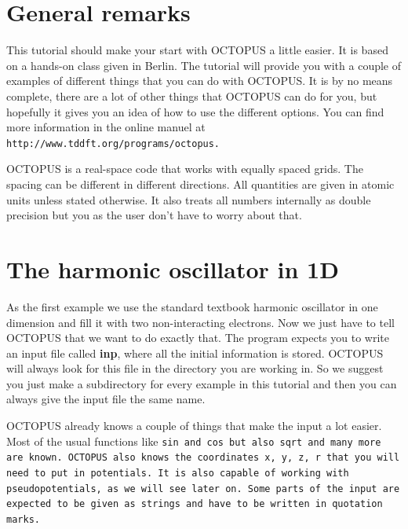\documentclass{article}
\begin{document}
\thispagestyle{empty}

\pagebreak

\tableofcontents

\pagebreak

\section{General remarks}

This tutorial should make your start with OCTOPUS a little easier. It is based
on a hands-on class given in Berlin. The tutorial will provide you with a
couple of examples of different things that you can do with OCTOPUS. It is by
no means complete, there are a lot of other things that OCTOPUS can do for you,
but hopefully it gives you an idea of how to use the different options. You can
find more information in the online manuel at \tt
http://www.tddft.org/programs/octopus. \rm

OCTOPUS is a real-space code that works with equally spaced grids. The spacing
can be different in different directions. All quantities are given in atomic
units unless stated otherwise. It also treats all numbers internally as double
precision but you as the user don't have to worry about that.

\section{The harmonic oscillator in 1D} 

As the first example we use the standard textbook harmonic oscillator in one
dimension and fill it with two non-interacting electrons. Now we just have to
tell OCTOPUS that we want to do exactly that. The program expects you to write
an input file called {\bf inp}, where all the initial information is stored.
OCTOPUS will always look for this file in the directory you are working in. So
we suggest you just make a subdirectory for every example in this tutorial and
then you can always give the input file the same name.

OCTOPUS already knows a couple of things that make the input a lot easier. Most
of the usual functions like \tt sin \rm and \tt cos \rm but also \tt sqrt \rm
and many more are known. OCTOPUS also knows the coordinates \tt x, y, z, r \rm
that you will need to put in potentials. It is also capable of working with
pseudopotentials, as we will see later on. Some parts of the input are expected to
be given as strings and have to be written in quotation marks.
\end{document}
